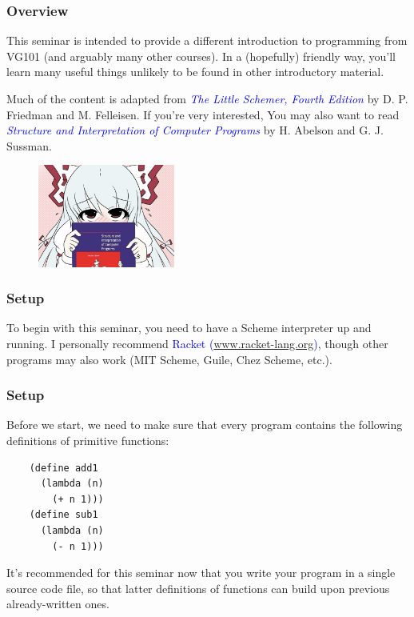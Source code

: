 \documentclass[xcolor=pdftex,dvipsnames,table]{beamer}
\begin{document}
\begin{frame}
\begin{columns}
\begin{column}{0.5\textwidth}
\begin{center}
\begin{figure}
        \end{figure}
      \end{center}
    \end{column}
  \end{columns}
\end{frame}
\begin{frame}[fragile]
  \frametitle{Overview}
  This seminar is intended to provide a different introduction to programming from VG101 (and arguably many other courses).
  In a (hopefully) friendly way, you'll learn many useful things unlikely to be found in other introductory material.
  \pause

  Much of the content is adapted from \textcolor{Blue}{\textit{The Little Schemer, Fourth Edition}} by D. P. Friedman and M. Felleisen.
  If you're very interested, You may also want to read \textcolor{Blue}{\textit{Structure and Interpretation of Computer Programs}} by H. Abelson and G. J. Sussman.
  \begin{center}
    \begin{figure}
      \includegraphics[width=0.4\textwidth]{SICP.png}
    \end{figure}
  \end{center}
\end{frame}
\begin{frame}
  \frametitle{Setup}
  To begin with this seminar, you need to have a Scheme interpreter up and running.
  I personally recommend \textcolor{Blue}{Racket (\url{www.racket-lang.org})}, though other programs may also work (MIT Scheme, Guile, Chez Scheme, etc.).
\end{frame}
\begin{frame}[fragile]
  \frametitle{Setup}
  Before we start, we need to make sure that every program contains the following definitions of primitive functions:
  \begin{verbatim}
    (define add1
      (lambda (n)
        (+ n 1)))
    (define sub1
      (lambda (n)
        (- n 1)))
  \end{verbatim}
  It's recommended for this seminar now that you write your program in a single source code file, so that latter definitions of functions can build upon previous already-written ones.
\end{frame}
\end{document}
